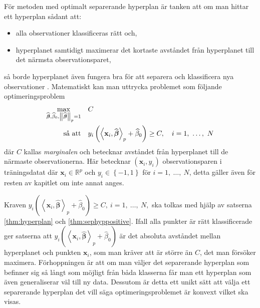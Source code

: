 \documentclass[a4paper, 12pt]{report}
\theoremstyle{definition}
\theoremstyle{remark}
\newtheorem*{rem}{Observation}
\newcommand{\bfbeta}{{\boldsymbol{\beta}}}
\newcommand{\bfx}{\mathbf{x}}
\newcommand{\llangle}{\left\langle}
\newcommand{\rrangle}{\right\rangle}
\newcommand{\inner}[2]{\llangle #1, #2 \rrangle}
\begin{document}
För metoden med optimalt separerande hyperplan är tanken att om man hittar ett hyperplan sådant att:
\begin{itemize}
	\item alla observationer klassificeras rätt och,
	\item hyperplanet samtidigt maximerar det kortaste avståndet från hyperplanet till det närmsta observationsparet,
\end{itemize}
så borde hyperplanet även fungera bra för att separera och klassificera nya observationer \cite{VapnikLerner1963}.
Matematiskt kan man uttrycka problemet som följande optimeringsproblem
\begin{equation}\label{opt:optimalmargin1}
\begin{aligned}
	 \operatornamewithlimits{max}_{\widehat{\bfbeta}, \widehat{\beta}_0, \left\|\widehat{\bfbeta}\right\|_p=1}& & &C\\
	 \text{så att}& & &y_i\left(\inner{\bfx_i}{\widehat{\bfbeta}}_p+\widehat{\beta}_0\right)\geq C,\quad i=1,~\dots,~N
\end{aligned}
\end{equation}
där $C$ kallas \emph{marginalen} och betecknar avståndet från hyperplanet till de närmaste observationerna. Här betecknar $\left(\bfx_i, y_i\right)$ observationsparen i träningsdatat där $\bfx_i\in\mathbb{R}^p$ och $y_i\in\left\{-1, 1 \right\}$ för $i=1,~\dots,~N$, detta gäller även för resten av kapitlet om inte annat anges.

Kraven $y_i\left(\inner{\bfx_i}{\widehat{\bfbeta}}_p+\widehat{\beta}_0\right)\geq C, ~i=1,~\dots,~N,$ ska tolkas med hjälp av satserna \ref{thm:hyperplan} och \ref{thm:sephyppositive}. 
Ifall alla punkter är rätt klassificerade ger satserna att $y_i\left(\inner{\bfx_i}{\widehat{\bfbeta}}_p+\widehat{\beta}_0\right)$ är det absoluta avståndet mellan hyperplanet och punkten $\mathbf{x}_i$, som man kräver att är större än $C$, det man försöker maximera.
Förhoppningen är att om man väljer det separerande hyperplan som befinner sig så långt som möjligt från båda klasserna får man ett hyperplan som även generaliserar väl till ny data. Dessutom är detta ett unikt sätt att välja ett separerande hyperplan det vill säga optimeringsproblemet är konvext \cite{ESL} vilket ska visas. %
\end{document}
